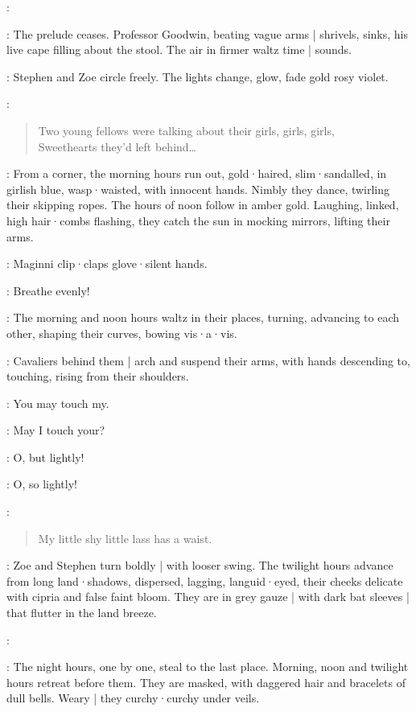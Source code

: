 \Maginni:

:
The prelude ceases.
Professor Goodwin,
beating vague arms |
shrivels,
sinks,
his live cape filling about the stool.
The air in firmer waltz time |
sounds.

:
Stephen and Zoe circle freely.
The lights change,
%
glow,
fade gold rosy violet.

\Pianola[2]:
\begin{verse}
    Two young fellows were talking about their girls, girls, girls,\\
    Sweethearts they'd left behind…
\end{verse}

:
From a corner,
the morning hours run out,
gold·haired,
slim·sandalled,
in girlish blue,
wasp·waisted,
with innocent hands.
Nimbly they dance,
twirling their skipping ropes.
The hours of noon follow in amber gold.
Laughing,
linked,
high hair·combs flashing,
they catch the sun in mocking mirrors,
lifting their arms.

:
Maginni clip·claps glove·silent hands.

\Maginni:
Breathe evenly!

:
The morning and noon hours waltz in their places,
turning,
advancing to each other,
shaping their curves,
bowing vis·a·vis.

:
Cavaliers behind them |
arch and suspend their arms,
with hands descending to,
touching,
rising from their shoulders.

\Hours:
You may touch my.

\Cavaliers:
May I touch your?

\Hours:
O,
but lightly!

\Cavaliers:
O,
so lightly!

\Pianola:
\begin{verse}
    My little shy little lass has a waist.
\end{verse}

:
Zoe and Stephen turn boldly |
with looser swing.
The twilight hours advance from long land·shadows,
dispersed,
lagging,
languid·eyed,
their cheeks delicate with cipria and false faint bloom.
They are in grey gauze |
with dark bat sleeves |
that flutter in the land breeze.

\Maginni[2]:

:
The night hours,
one by one,
steal to the last place.
Morning,
noon and twilight hours retreat before them.
They are masked,
with daggered hair and bracelets of dull bells.
Weary |
they curchy·curchy under veils.


